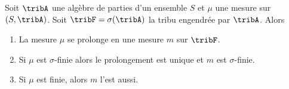 \begin{theorem}    \label{ThoLCQoojiFfZ}
    Soit \( \tribA\) une algèbre de parties d'un ensemble \( S\) et \( \mu\) une mesure sur \( (S,\tribA)\). Soit \( \tribF=\sigma(\tribA)\) la tribu engendrée par \( \tribA\). Alors
    \begin{enumerate}
        \item
            La mesure \( \mu\) se prolonge en une mesure \( m\) sur \( \tribF\).
        \item
            Si \( \mu\) est \( \sigma\)-finie alors le prolongement est unique et \( m\) est \( \sigma\)-finie.
        \item
            Si \( \mu\) est finie, alors \( m\) l'est aussi.
    \end{enumerate}
\end{theorem}

